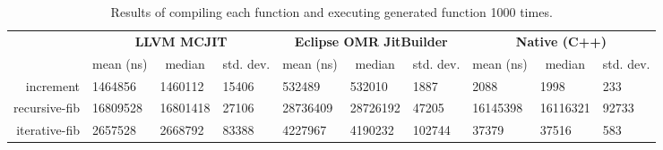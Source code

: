 \begin{table*}[t]
  \begin{tabular}{|r|l|l|l|l|l|l|l|l|l|}
  \hline
  \multicolumn{1}{|l|}{\multirow{2}{*}{}} & \multicolumn{3}{c|}{\textbf{LLVM MCJIT}}                                                                                     & \multicolumn{3}{c|}{\textbf{Eclipse OMR JitBuilder}}                                                                & \multicolumn{3}{c|}{\textbf{Native (C++)}}                                                                               \\ \cline{2-10}
  \multicolumn{1}{|c|}{\textbf{Program}}  & \multicolumn{1}{c|}{mean (ns)}           & \multicolumn{1}{c|}{median}  & \multicolumn{1}{c|}{std. dev.}                     & \multicolumn{1}{c|}{mean (ns)}           & \multicolumn{1}{c|}{median}  & \multicolumn{1}{c|}{std. dev.}            & \multicolumn{1}{c|}{mean (ns)}  & \multicolumn{1}{c|}{median}  & \multicolumn{1}{c|}{std. dev.}                        \\ \hline
  increment                               & \num{1464856}                            & \num{1460112}                & \num{15406}                                        & \num{532489}                             & \num{532010}                 & \num{1887}                                & \num{2088}                              & \num{1998}                   & \num{233}                                \\ \hline
  recursive-fib                           & \num{16809528}                           & \num{16801418}               & \num{27106}                                        & \num{28736409}                           & \num{28726192}               & \num{47205}                               & \num{16145398}                          & \num{16116321}               & \num{92733}                                \\ \hline
  iterative-fib                           & \num{2657528}                            & \num{2668792}                & \num{83388}                                        & \num{4227967}                            & \num{4190232}                & \num{102744}                              & \num{37379}                             & \num{37516}                  & \num{583}                                \\ \hline
  \end{tabular}
  \caption{Results of compiling each function and executing generated function 1000 times.}
  \label{tab:1k_time}
\end{table*}


